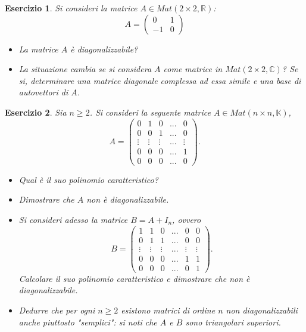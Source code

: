 \documentclass{article}
\newtheorem{es}{Esercizio}
\begin{document}
{\begin{es}
    Si consideri la matrice $A\in Mat(2\times 2, \mathbb{R})$:
    $$
    A=\begin{pmatrix}
        0 & 1 \\
        -1 & 0
    \end{pmatrix}
    $$
    \begin{itemize}
        \item La matrice $A$ è diagonalizzabile?
        \item La situazione cambia se si considera $A$ come matrice in $Mat(2 \times 2, \mathbb{C})$? Se si, determinare una matrice diagonale complessa ad essa simile e una base di autovettori di $A$.
    \end{itemize}
\end{es}

\begin{es}
    Sia $n\geq 2$. Si consideri la seguente matrice $A\in Mat(n \times n, \mathbb{K})$, $$
    A=\begin{pmatrix}
        0 & 1 & 0 & ... & 0\\
        0 & 0 & 1 & ... & 0 \\
        \vdots & \vdots & \vdots & ... & \vdots \\
        0 & 0 & 0 & ... & 1 \\
        0 & 0 & 0 & ... & 0
    \end{pmatrix}.
    $$
    \begin{itemize}
        \item Qual è il suo polinomio caratteristico?
        \item Dimostrare che $A$ non è diagonalizzabile.
        \item Si consideri adesso la matrice $B=A+I_n$, ovvero $$
        B=\begin{pmatrix}
            1 & 1 & 0 & ... & 0 & 0 \\
            0 & 1 & 1 & ... & 0 & 0 \\
            \vdots & \vdots & \vdots & ... & \vdots & \vdots \\
            0 & 0 & 0 & ... & 1 & 1 \\
            0 & 0 & 0 & ... & 0 & 1
        \end{pmatrix}.
        $$
        Calcolare il suo polinomio caratteristico e dimostrare che non è diagonalizzabile.
        \item Dedurre che per ogni $n\geq 2$ esistono matrici di ordine $n$ non diagonalizzabili anche piuttosto "semplici": si noti che $A$ e $B$ sono triangolari superiori.
        

\end{itemize}
\end{es}}
\end{document}
